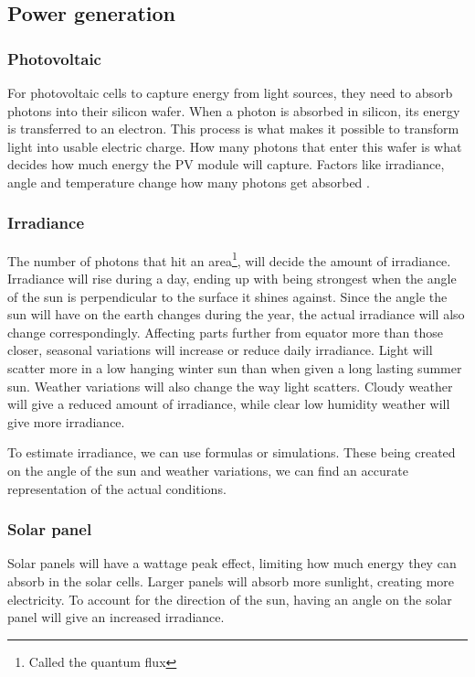 \subsection{Power generation}

\subsubsection{Photovoltaic}
For photovoltaic cells to capture energy from light sources, they need to absorb photons into their silicon wafer. When a photon is absorbed in silicon, its energy is transferred to an electron. This process is what makes it possible to transform light into usable electric charge. How many photons that enter this wafer is what decides how much energy the PV module will capture. Factors like irradiance, angle and temperature change how many photons get absorbed \citep{wirthPhotovoltaicModulesTechnology2016}.

\subsubsection{Irradiance}
The number of photons that hit an area\footnote{Called the quantum flux}, will decide the amount of irradiance. Irradiance will rise during a day, ending up with being strongest when the angle of the sun is perpendicular to the surface it shines against. Since the angle the sun will have on the earth changes during the year, the actual irradiance will also change correspondingly. Affecting parts further from equator more than those closer, seasonal variations will increase or reduce daily irradiance. Light will scatter more in a low hanging winter sun than when given a long lasting summer sun. Weather variations will also change the way light scatters. Cloudy weather will give a reduced amount of irradiance, while clear low humidity weather will give more irradiance. 

To estimate irradiance, we can use formulas or simulations. These being created on the angle of the sun and weather variations, we can find an accurate representation of the actual conditions. 

\subsubsection{Solar panel}
Solar panels will have a wattage peak effect, limiting how much energy they can absorb in the solar cells. Larger panels will absorb more sunlight, creating more electricity. To account for the direction of the sun, having an angle on the solar panel will give an increased irradiance.

